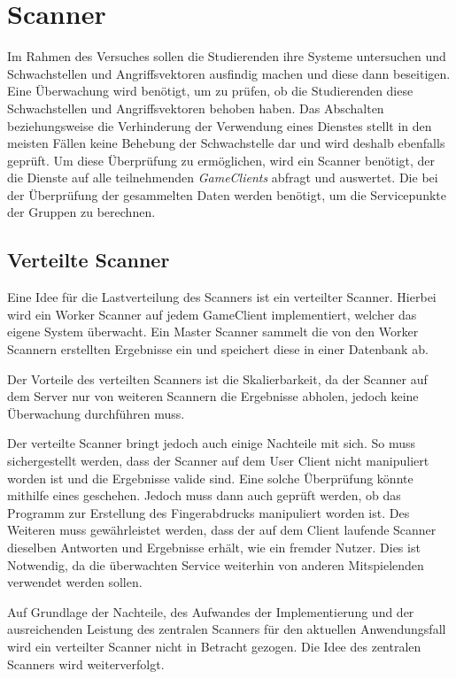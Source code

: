 \section{Scanner} \label{sec:Scanner}
Im Rahmen des Versuches sollen die Studierenden ihre Systeme untersuchen und Schwachstellen und Angriffsvektoren ausfindig machen und diese dann beseitigen. Eine Überwachung wird benötigt, um zu prüfen, ob die Studierenden diese Schwachstellen und Angriffsvektoren behoben haben. Das Abschalten beziehungsweise die Verhinderung der Verwendung eines Dienstes stellt in den meisten Fällen keine Behebung der Schwachstelle dar und wird deshalb ebenfalls geprüft. Um diese Überprüfung zu ermöglichen, wird ein Scanner benötigt, der die Dienste auf alle teilnehmenden \textit{GameClients} abfragt und auswertet. Die bei der Überprüfung der gesammelten Daten werden benötigt, um die Servicepunkte der Gruppen zu berechnen.

\subsection{Verteilte Scanner}
Eine Idee für die Lastverteilung des Scanners ist ein verteilter Scanner. Hierbei wird ein Worker Scanner auf jedem GameClient implementiert, welcher das eigene System überwacht. Ein Master Scanner sammelt die von den Worker Scannern erstellten Ergebnisse ein und speichert diese in einer Datenbank ab. 

Der Vorteile des verteilten Scanners ist die Skalierbarkeit, da der Scanner auf dem Server nur von weiteren Scannern die Ergebnisse abholen, jedoch keine Überwachung durchführen muss.

Der verteilte Scanner bringt jedoch auch einige Nachteile mit sich. So muss sichergestellt werden, dass der Scanner auf dem User Client nicht manipuliert worden ist und die Ergebnisse valide sind. Eine solche Überprüfung könnte mithilfe eines  geschehen. Jedoch muss dann auch geprüft werden, ob das Programm zur Erstellung des Fingerabdrucks manipuliert worden ist.   Des Weiteren muss gewährleistet werden, dass der auf dem Client laufende Scanner dieselben Antworten und Ergebnisse erhält, wie ein fremder Nutzer. Dies ist Notwendig, da die überwachten Service weiterhin von anderen Mitspielenden verwendet werden sollen.

Auf Grundlage der Nachteile, des Aufwandes der Implementierung und der ausreichenden Leistung des zentralen Scanners für den aktuellen Anwendungsfall wird ein verteilter Scanner nicht in Betracht gezogen. Die Idee des zentralen Scanners wird weiterverfolgt.


